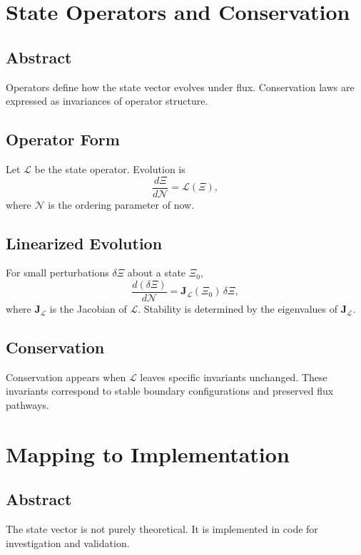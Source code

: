 \documentclass[12pt]{book}
\begin{document}
\chapter{State Operators and Conservation}

\section*{Abstract}
Operators define how the state vector evolves under flux. Conservation laws are expressed as invariances
of operator structure.

\section{Operator Form}
Let $\mathcal{L}$ be the state operator. Evolution is
\begin{equation}
\frac{d\Xi}{d\mathcal{N}} = \mathcal{L}(\Xi),
\end{equation}
where $\mathcal{N}$ is the ordering parameter of now.

\section{Linearized Evolution}
For small perturbations $\delta\Xi$ about a state $\Xi_0$,
\begin{equation}
\frac{d(\delta\Xi)}{d\mathcal{N}} = \mathbf{J}_{\mathcal{L}}(\Xi_0)\, \delta\Xi,
\end{equation}
where $\mathbf{J}_{\mathcal{L}}$ is the Jacobian of $\mathcal{L}$. Stability is determined by the
eigenvalues of $\mathbf{J}_{\mathcal{L}}$.

\section{Conservation}
Conservation appears when $\mathcal{L}$ leaves specific invariants unchanged. These invariants correspond
to stable boundary configurations and preserved flux pathways.

\chapter{Mapping to Implementation}

\section*{Abstract}
The state vector is not purely theoretical. It is implemented in code for investigation and validation.
\end{document}
